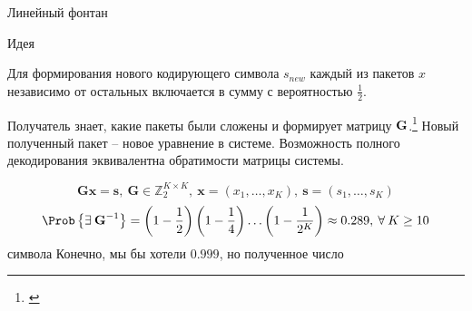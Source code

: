 \documentclass{beamer}
\begin{document}
\begin{frame}{Линейный фонтан}

    \begin{block}{Идея}

        Для формирования нового кодирующего символа $s_{new}$
        каждый из пакетов $x$ независимо от остальных включается
        в сумму с вероятностью $\frac 12$.

    \end{block}

    Получатель знает, какие пакеты были сложены и формирует матрицу $\textbf G$.\footnote{\cite{MacKay2005Dec}}
    Новый полученный пакет -- новое уравнение в системе. 
    Возможность полного декодирования эквивалентна обратимости матрицы системы.

    \[
        \textbf{G}\textbf{x}=\textbf{s}, \:
        \textbf{G}\in\mathbb Z_2^{K\times K}, \:
        \textbf{x} = (x_1,\dots,x_K), \:
        \textbf{s} = (s_1,\dots, s_K)
    \]
    \[
        \Prob \left\{ \exists\: \textbf{G}^{-1} \right\}
        =
        \left(1 - \frac12\right)
        \left(1 - \frac14\right)
        \dots
        \left(1 - \frac1{2^K}\right)
        \approx
        0.289,
        \fall K\ge 10
    \]
символа
    Конечно, мы бы хотели $0.999$, но полученное число 

\end{frame}

\end{document}
